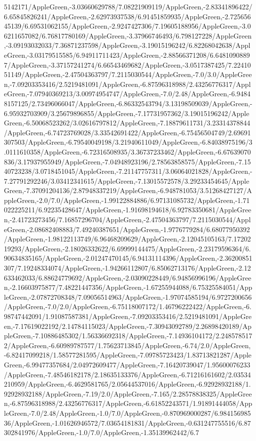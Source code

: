 {\begin{tikzternal}
5142171/AppleGreen,-3.03660629788/7.08221909119/AppleGreen,-2.83341896422/6.65845826241/AppleGreen,-2.62973937538/6.91451859935/AppleGreen,-2.72565645139/6.69531062155/AppleGreen,-2.9247427306/7.19605188956/AppleGreen,-3.06211657082/6.76817780169/AppleGreen,-3.37966746493/6.798127228/AppleGreen,-3.09193032033/7.36871237598/AppleGreen,-3.19015196242/6.82268042638/AppleGreen,-3.03179515585/6.94911711423/AppleGreen,-2.88566371208/6.64810908897/AppleGreen,-3.37157241274/6.66543469682/AppleGreen,-3.0517387425/7.2241051149/AppleGreen,-2.47504363797/7.2115030544/AppleGreen,-7.0/3.0/AppleGreen,-7.09203353416/2.5219481091/AppleGreen,-6.87596318988/2.43256776317/AppleGreen,-7.07940369213/3.00974954747/AppleGreen,-7.0/2.48/AppleGreen,-6.94848157125/2.73496066047/AppleGreen,-6.86332543794/3.13198509039/AppleGreen,-6.95932703909/3.25679896855/AppleGreen,-7.17731957362/3.19015196242/AppleGreen,-6.50068523262/3.02616797812/AppleGreen,-7.18879611731/3.23314378844/AppleGreen,-6.74723769028/3.33542691422/AppleGreen,-6.75456504749/2.69691307503/AppleGreen,-6.79540049198/3.21940611049/AppleGreen,-6.84038975196/3.0111610358/AppleGreen,-6.72316508935/3.36737233462/AppleGreen,-6.67639070836/3.17937955949/AppleGreen,-7.04948923196/2.78563858575/AppleGreen,-7.1540723238/3.0718451045/AppleGreen,-7.21147757311/3.06064021828/AppleGreen,-7.27791292246/3.03412341615/AppleGreen,-7.13015572578/3.29233454645/AppleGreen,-7.37091204136/2.87948337219/AppleGreen,-6.948781053/3.51268427127/AppleGreen,-2.0/7.0/AppleGreen,-1.99122884886/6.97131085732/AppleGreen,-1.71022225211/6.92235428647/AppleGreen,-1.91698194618/6.92783350681/AppleGreen,-2.41723273456/7.16857296704/AppleGreen,-2.47504363797/7.2115030544/AppleGreen,-2.08682408883/7.49240387651/AppleGreen,-1.9776779284/6.68077950392/AppleGreen,-1.98122113749/6.96468209629/AppleGreen,-2.12045105163/7.1720219293/AppleGreen,-2.18026332622/6.69999144475/AppleGreen,-2.23179596364/6.90634835165/AppleGreen,-2.01247470145/6.94131114396/AppleGreen,-2.36200851307/7.19248334074/AppleGreen,-1.94266112807/6.85062713176/AppleGreen,-2.12633462033/6.88624779692/AppleGreen,-2.03090228449/6.94856996196/AppleGreen,-2.16603975877/7.48221447356/AppleGreen,-1.67255944088/6.75325584051/AppleGreen,-2.07872708348/7.09056514963/AppleGreen,-1.97074585194/6.9727200656/AppleGreen,-7.0/2.0/AppleGreen,-6.75118007172/1.46796222422/AppleGreen,-6.98747442091/1.91087587381/AppleGreen,-7.09203353416/2.5219481091/AppleGreen,-7.17619022192/2.14784115023/AppleGreen,-7.30943092789/2.26898420189/AppleGreen,-7.10886485302/1.56336692318/AppleGreen,-7.14936104172/2.2485785172/AppleGreen,-6.60989787577/1.75623713845/AppleGreen,-6.74/2.0/AppleGreen,-6.82417099218/1.58577281595/AppleGreen,-7.09785723423/1.83713821287/AppleGreen,-6.99477357684/2.04972609477/AppleGreen,-7.16420739047/1.95600076233/AppleGreen,-7.48546182178/2.18635133376/AppleGreen,-6.71216161602/2.03534210959/AppleGreen,-6.4629581765/2.05644537016/AppleGreen,-6.92928932188/1.92928932188/AppleGreen,-7.19/2.0/AppleGreen,-7.165/2.28578838325/AppleGreen,-6.87596318988/2.43256776317/AppleGreen,-6.61852243571/1.91891444058/AppleGreen,-7.0/2.48/AppleGreen,-1.0/7.0/AppleGreen,-0.870969000287/6.98415698536/AppleGreen,-1.01626946572/7.03654181831/AppleGreen,-0.631247755516/6.87302841976/AppleGreen,-1.0/7.0/AppleGreen,-1.35139962442/6.7
\end{tikzternal}}
